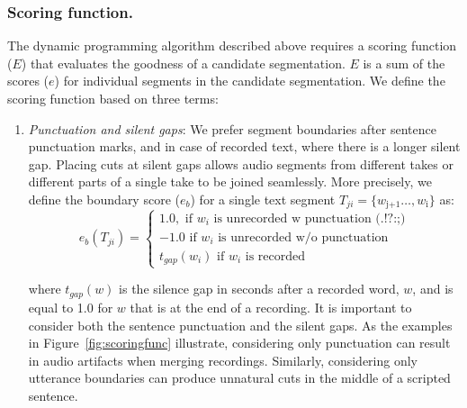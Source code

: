 \subsubsection{Scoring function.}
The dynamic programming algorithm described above requires a
scoring function ($E$) that evaluates the goodness of a candidate segmentation. $E$ is a sum of the scores ($e$) for individual segments in the candidate segmentation. We define the scoring function
based on three terms: 
\begin{enumerate}
\item{\textit{Punctuation and silent gaps}: We prefer segment boundaries after sentence punctuation marks, and in case of recorded text, where there is a longer silent gap. Placing cuts at silent gaps allows audio segments from different takes or different parts of a single take to be joined seamlessly. More precisely, we define the boundary score ($e_b$) for a single text segment $T_{ji} = \{w_\text{j+1}
\dots,w_\text{i}\}$ as:
\begin{equation}
    e_b(T_{ji})= 
\begin{cases}
   1.0, \text{ if } w_i \text{ is unrecorded w punctuation (.!?:;)}\\
   -1.0 \text{ if } w_i \text{ is unrecorded w/o punctuation}\\
   t_{gap}(w_{i}) \text{ if } w_i \text{ is recorded} 
\end{cases}
\end{equation}

where $t_{gap}(w)$ is the silence gap in seconds after a recorded word, $w$, and is equal to 1.0 for $w$ that is at the end of a recording.
It is important to consider both the sentence punctuation and the silent gaps. As the examples in Figure~\ref{fig:scoringfunc} illustrate, considering only punctuation can result in audio artifacts when merging recordings. Similarly, considering only utterance boundaries can produce unnatural cuts in the middle of a scripted sentence.
}


\end{enumerate}
